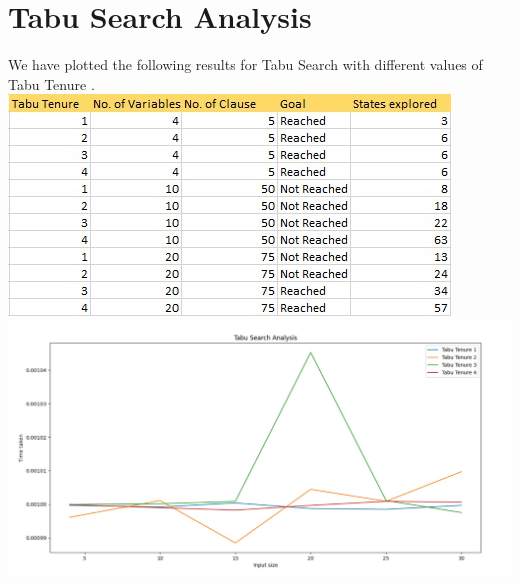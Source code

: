 \documentclass{article}
\begin{document}
\section{Tabu Search Analysis}
We have plotted the following results for Tabu Search with different values of Tabu Tenure .
\vspace*{10pt}
\\\hspace*{50pt}\includegraphics{Table2.jpg}
\\\includegraphics[scale=0.35]{TabuSearch.jpg}
\newpage
\end{document}
